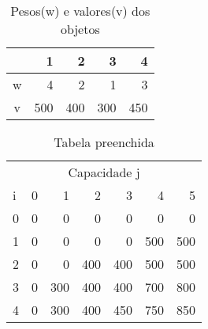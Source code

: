 \begin{table}[ht]
    \begin{center}
      \begin{tabular}{c|rrrr}
& 1 & 2 & 3 & 4 \\
        \hline
w & 4   & 2   & 1   & 3 \\
v & 500 & 400 & 300 & 450 \\
      \end{tabular}
    \end{center}
    \caption{Pesos(w) e valores(v) dos objetos}
  \end{table}

\begin{table}[ht]
    \begin{center}
      \begin{tabular}{l|rrrrrr}
        \multicolumn{7}{c}{Capacidade j}\\
i & 0 & 1 & 2 & 3 & 4 & 5 \\
        \hline
0 & 0 & 0   & 0   & 0     & 0     & 0 \\
1 & 0 & 0   & 0   & 0     & 500   & 500 \\
2 & 0 & 0   & 400 & 400   & 500   & 500 \\
3 & 0 & 300 & 400 & 400   & 700   & 800 \\
4 & 0 & 300 & 400 & 450   & 750   & 850 \\
      \end{tabular}
    \end{center}
    \caption{Tabela preenchida}
  \end{table}
